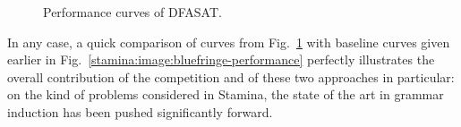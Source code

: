 \begin{figure}[ht]
\centering{}
  \caption{Performance curves of DFASAT\label{image:stamina-winners-performance-comparison}.}
\end{figure}

In any case, a quick comparison of curves from Fig.~\ref{image:stamina-winners-performance-comparison} with baseline curves given earlier in Fig.~\ref{stamina:image:bluefringe-performance} perfectly illustrates the overall contribution of the competition and of these two approaches in particular: on the kind of problems considered in Stamina, the state of the art in grammar induction has been pushed significantly forward.

